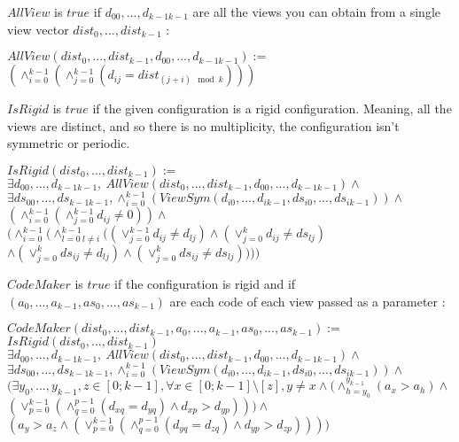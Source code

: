 \documentclass{article}
\begin{document}
$AllView$ is $true$ if $d_{00}, ...,d_{k-1k-1}$ are all the views you can obtain from a single view vector $dist_{0}, ...,dist_{k-1}$ :

\begin{center}
    
$AllView(dist_{0}, ...,dist_{k-1}, d_{00}, ...,d_{k-1k-1}):=$\\
$(\land_{i=0}^{k-1} (\land_{j=0}^{k-1} (d_{ij} = dist_{(j+i) \mod{k}}) ) )$
\end{center}

$IsRigid$ is $true$ if the given configuration is a rigid configuration. Meaning, all the views are distinct, and so there is no multiplicity, the configuration isn't symmetric or periodic.

\begin{center}

$IsRigid(dist_{0}, ...,dist_{k-1}):=$\\
$\exists d_{00}, ...,d_{k-1k-1},\ AllView(dist_{0}, ...,dist_{k-1}, d_{00}, ...,d_{k-1k-1})\land$\\
$\exists ds_{00}, ...,ds_{k-1k-1}, \land_{i=0}^{k-1} (ViewSym(d_{i0}, ..., d_{ik-1}, ds_{i0}, ..., ds_{ik-1}))\land$\\
$(\land_{i=0}^{k-1}(\land_{j=0}^{k-1}d_{ij}\not=0))\land $\\%
$( \land_{i=0}^{k-1}(
\land_{l=0\ l\not=i}^{k-1}(
(\lor_{j=0}^{k-1}d_{ij} \not= d_{lj})
\land (\lor_{j=0}^{k}d_{ij} \not= ds_{lj})$\\
$\land (\lor_{j=0}^{k}ds_{ij} \not= d_{lj})
\land (\lor_{j=0}^{k}ds_{ij} \not= ds_{lj})
) ))$\\%
\end{center}

$CodeMaker$ is $true$ if the configuration is rigid and if $(a_{0}, ..., a_{k-1}, as_{0}, ..., as_{k-1})$ are each code of each view passed as a parameter :

\begin{center}

$CodeMaker(dist_{0}, ...,dist_{k-1}, a_{0}, ..., a_{k-1}, as_{0}, ..., as_{k-1}):=$\\
$IsRigid(dist_{0}, ...,dist_{k-1})$\\
$\exists d_{00}, ...,d_{k-1k-1},\ AllView(dist_{0}, ...,dist_{k-1}, d_{00}, ...,d_{k-1k-1})\land$\\
$\exists ds_{00}, ...,ds_{k-1k-1}, \land_{i=0}^{k-1} (ViewSym(d_{i0}, ..., d_{ik-1}, ds_{i0}, ..., ds_{ik-1}))\land$\\
$(\exists y_{0}, ..., y_{k-1},z \in [0;k-1], \forall x \in [0;k-1] \setminus [z], y\not=x \land
(\land_{h=y_{0}}^{y_{k-1}}(a_{x} > a_{h}) \land $\\
$(\lor_{p=0}^{k-1}(\land_{q=0}^{p-1}(d_{xq} = d_{yq}) \land d_{xp} > d_{yp} ) ) )\land $\\
$(a_{y} > a_{z} \land (\lor_{p=0}^{k-1}(\land_{q=0}^{p-1}(d_{yq} = d_{zq}) \land d_{yp} > d_{zp} ) ))
)$\\
\end{center}
\end{document}
